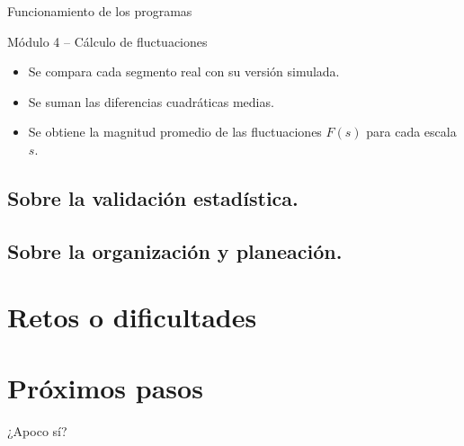 \documentclass[11pt]{beamer}
\begin{document}
\begin{frame}{Funcionamiento de los programas}
\begin{block}{Módulo 4 – Cálculo de fluctuaciones}
\begin{itemize}
    \item Se compara cada segmento real con su versión simulada.
    \item Se suman las diferencias cuadráticas medias.
    \item Se obtiene la magnitud promedio de las fluctuaciones $F(s)$ para cada escala $s$.
\end{itemize}
\end{block}
\end{frame}
\subsection{Sobre la validación estadística.}
\subsection{Sobre la organización y planeación.}
\section{Retos o dificultades}
\section{Próximos pasos}
\begin{frame}{¿Apoco sí?}

\end{frame}
\end{document}

